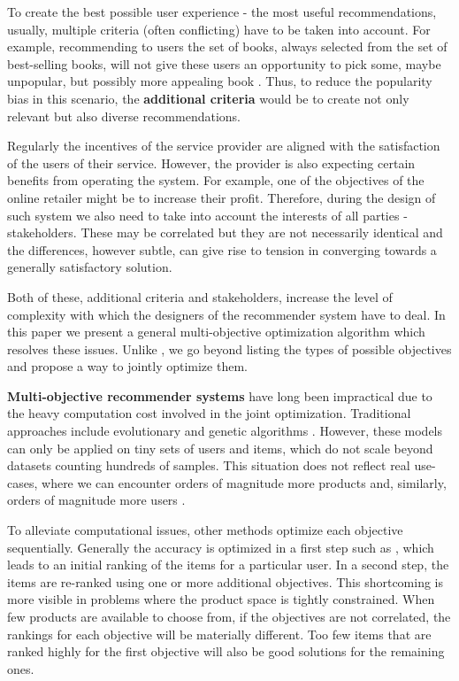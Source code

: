 \documentclass[letterpaper]{article}
\begin{document}
To create the best possible user experience - the most useful recommendations, usually, multiple criteria (often conflicting) have to be taken into account. For example, recommending to users the set of  books, always selected from the set of best-selling books, will not give these users an opportunity to pick some, maybe unpopular, but possibly more appealing book \cite{abdollahpouri2017controlling}. Thus, to reduce the popularity bias in this scenario, the \textbf{additional criteria} would be to create not only relevant but also diverse recommendations.

Regularly the incentives of the service provider are aligned with the satisfaction of the users of their service. However, the provider is also expecting certain benefits from operating the system. For example, one of the objectives of the online retailer might be to increase their profit. Therefore, during the design of such system we also need to take into account the interests of all parties - stakeholders. These may be correlated but they are not necessarily identical and the differences, however subtle, can give rise to tension in converging towards a generally satisfactory solution.

Both of these, additional criteria and stakeholders, increase the level of complexity with which the designers of the recommender system have to deal. In this paper we present a general multi-objective optimization algorithm which resolves these issues. Unlike \cite{burke2018balanced}, we go beyond listing the types of possible objectives and propose a way to jointly optimize them.

\textbf{Multi-objective recommender systems} have long been impractical due to the heavy computation cost involved in the joint optimization. Traditional approaches include evolutionary and genetic algorithms \cite{lin2018multiobjective,lin2019evolutionary,geng2015nnia}. However, these models can only be applied on tiny sets of users and items, which do not scale beyond datasets counting hundreds of samples. This situation does not reflect real use-cases, where we can encounter orders of magnitude more products \cite{Gomez-Uribe:2015:NRS:2869770.2843948} and, similarly, orders of magnitude more users \cite{1167344}.

To alleviate computational issues, other methods optimize each objective sequentially. Generally the accuracy is optimized in a first step such as \cite{di2017adaptive,jugovac2017efficient}, which leads to an initial ranking of the items for a particular user. In a second step, the items are re-ranked using one or more additional objectives. This shortcoming is more visible in problems where the product space is tightly constrained. When few products are available to choose from, if the objectives are not correlated, the rankings for each objective will be materially different. Too few items that are ranked highly for the first objective will also be good solutions for the remaining ones.
\end{document}
